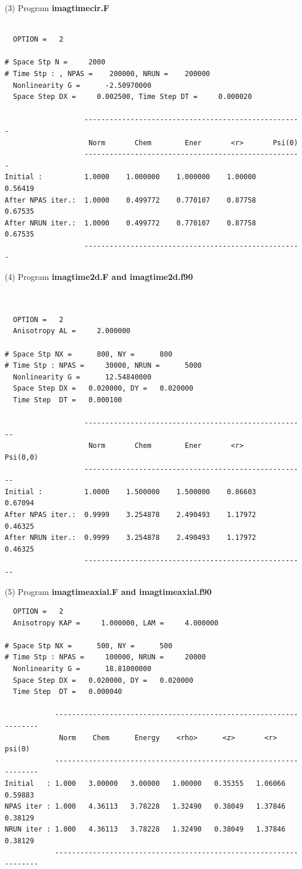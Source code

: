 \documentclass[onecolumn]{elsart3p}
\begin{document}
(3)  Program {\bf imagtimecir.F}
\begin{verbatim}

  OPTION =   2

# Space Stp N =     2000
# Time Stp : , NPAS =    200000, NRUN =    200000
  Nonlinearity G =      -2.50970000
  Space Step DX =     0.002500, Time Step DT =     0.000020

                   ----------------------------------------------------
                    Norm       Chem        Ener       <r>       Psi(0)
                   ----------------------------------------------------
Initial :          1.0000    1.000000    1.000000    1.00000    0.56419
After NPAS iter.:  1.0000    0.499772    0.770107    0.87758    0.67535
After NRUN iter.:  1.0000    0.499772    0.770107    0.87758    0.67535
                   ----------------------------------------------------

\end{verbatim}


(4)  Program {\bf imagtime2d.F and imagtime2d.f90}
\begin{verbatim}


  OPTION =   2
  Anisotropy AL =     2.000000

# Space Stp NX =      800, NY =      800
# Time Stp : NPAS =     30000, NRUN =      5000
  Nonlinearity G =      12.54840000
  Space Step DX =   0.020000, DY =   0.020000
  Time Step  DT =   0.000100

                   -----------------------------------------------------
                    Norm       Chem        Ener       <r>       Psi(0,0)
                   -----------------------------------------------------
Initial :          1.0000    1.500000    1.500000    0.86603    0.67094
After NPAS iter.:  0.9999    3.254878    2.490493    1.17972    0.46325
After NRUN iter.:  0.9999    3.254878    2.490493    1.17972    0.46325
                   -----------------------------------------------------

\end{verbatim}


(5)  Program {\bf imagtimeaxial.F and imagtimeaxial.f90}
\begin{verbatim}
  OPTION =   2
  Anisotropy KAP =     1.000000, LAM =     4.000000

# Space Stp NX =      500, NY =      500
# Time Stp : NPAS =     100000, NRUN =     20000
  Nonlinearity G =      18.81000000
  Space Step DX =   0.020000, DY =   0.020000
  Time Step  DT =   0.000040

            ------------------------------------------------------------------
             Norm    Chem      Energy    <rho>      <z>       <r>     psi(0)
            ------------------------------------------------------------------
Initial   : 1.000   3.00000   3.00000   1.00000   0.35355   1.06066   0.59883
NPAS iter : 1.000   4.36113   3.78228   1.32490   0.38049   1.37846   0.38129
NRUN iter : 1.000   4.36113   3.78228   1.32490   0.38049   1.37846   0.38129
            ------------------------------------------------------------------

\end{verbatim}
\end{document}
